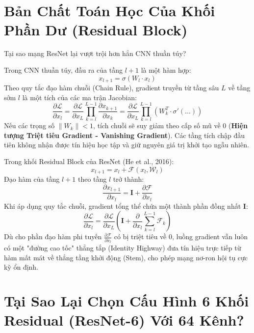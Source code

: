 \documentclass[11pt,a4paper]{report}
\begin{document}
\section{Bản Chất Toán Học Của Khối Phần Dư (Residual Block)}

Tại sao mạng ResNet lại vượt trội hơn hẳn CNN thuần túy? 

Trong CNN thuần túy, đầu ra của tầng $l+1$ là một hàm hợp:
\begin{equation}
    x_{l+1} = \sigma(W_l \cdot x_l)
\end{equation}
Theo quy tắc đạo hàm chuỗi (Chain Rule), gradient truyền từ tầng sâu $L$ về tầng sớm $l$ là một tích của các ma trận Jacobian:
\begin{equation}
    \frac{\partial \mathcal{L}}{\partial x_l} = \frac{\partial \mathcal{L}}{\partial x_L} \prod_{k=l}^{L-1} \frac{\partial x_{k+1}}{\partial x_k} = \frac{\partial \mathcal{L}}{\partial x_L} \prod_{k=l}^{L-1} \left( W_k^T \cdot \sigma'(\dots) \right)
\end{equation}
Nếu các trọng số $\|W_k\| < 1$, tích chuỗi sẽ suy giảm theo cấp số mũ về $0$ (\textbf{Hiện tượng Triệt tiêu Gradient - Vanishing Gradient}). Các tầng tích chập đầu tiên không nhận được tín hiệu học tập và giữ nguyên giá trị khởi tạo ngẫu nhiên.

Trong khối Residual Block của ResNet (He et al., 2016):
\begin{equation}
    x_{l+1} = x_l + \mathcal{F}(x_l, \mathcal{W}_l)
\end{equation}
Đạo hàm của tầng $l+1$ theo tầng $l$ trở thành:
\begin{equation}
    \frac{\partial x_{l+1}}{\partial x_l} = \mathbf{I} + \frac{\partial \mathcal{F}}{\partial x_l}
\end{equation}
Khi áp dụng quy tắc chuỗi, gradient tổng thể chứa một thành phần đồng nhất $\mathbf{I}$:
\begin{equation}
    \frac{\partial \mathcal{L}}{\partial x_l} = \frac{\partial \mathcal{L}}{\partial x_L} \left( \mathbf{I} + \frac{\partial}{\partial x_l} \sum_{k=l}^{L-1} \mathcal{F}_k \right)
\end{equation}
Dù cho phần đạo hàm phi tuyến $\frac{\partial \mathcal{F}}{\partial x_l}$ có bị triệt tiêu về $0$, luồng gradient vẫn luôn có một "đường cao tốc" thẳng tắp (Identity Highway) đưa tín hiệu trực tiếp từ hàm mất mát về thẳng tầng khởi động (Stem), cho phép mạng nơ-ron hội tụ cực kỳ ổn định.

\section{Tại Sao Lại Chọn Cấu Hình 6 Khối Residual (ResNet-6) Với 64 Kênh?}
\end{document}
